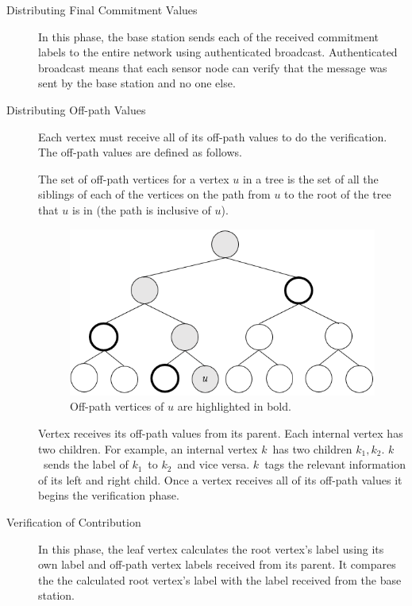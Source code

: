 	\begin{description}
		\item[Distributing Final Commitment Values]
			In this phase, the base station sends each of the received commitment labels to the entire network using authenticated broadcast.
			Authenticated broadcast means that each sensor node can verify that the message was sent by the base station and no one else.
		\item[Distributing Off-path Values]
			Each vertex must receive all of its off-path values to do the verification.
			The off-path values are defined as follows.
			\begin{definition}
				\label{def:off-path}
				\cite{chan2006secure}
				The set of off-path vertices for a vertex $u$ in a tree is the set of all the siblings of each of the vertices on the path from $u$ to the root of the tree that $u$ is in (the path is inclusive of $u$).
			\end{definition}
			\begin{figure}[h!]
				\centering
				\includegraphics[scale = 1]{images/off-path.png}
				\caption{Off-path vertices of $u$ are highlighted in bold.}
				\label{fig:commitment-tree-example-2-shia}
			\end{figure}
			Vertex receives its off-path values from its parent.
			Each internal vertex has two children.
			For example, an internal vertex $k$\ has two children $k_{1},k_{2}$.
			$k$\ sends the label of $k_{1}$\ to $k_{2}$\ and vice versa.
			$k$\ tags the relevant information of its left and right child.
			Once a vertex receives all of its off-path values it begins the verification phase.
		\item[Verification of Contribution]
			In this phase, the leaf vertex calculates the root vertex's label using its own label and off-path vertex labels received from its parent.
			It compares the the calculated root vertex's label with the label received from the base station.

\end{description}
